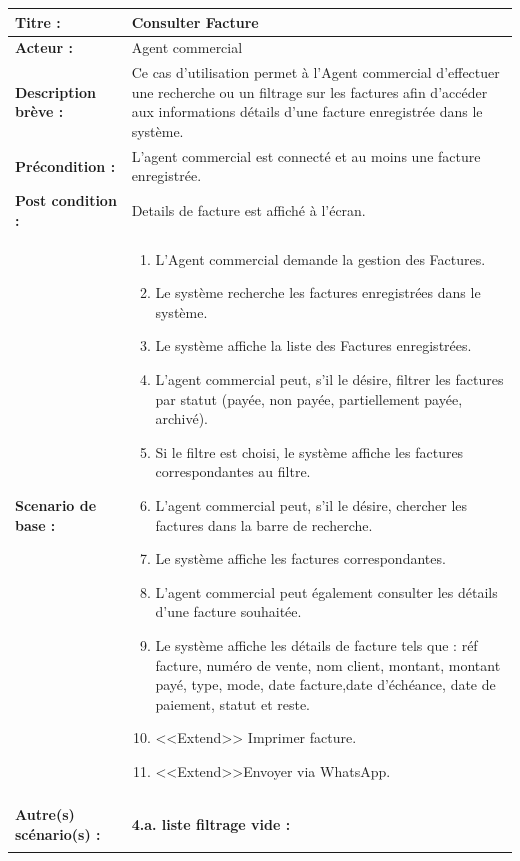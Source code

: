\begin{table}[H]
\footnotesize
\renewcommand{\arraystretch}{0.88}
\begin{tabularx}{\textwidth}{|p{3.4cm}|X|}
\hline
\textbf{Titre :} & Consulter Facture \\
\hline
\textbf{Acteur :} & Agent commercial \\
\hline
\textbf{Description brève :} & Ce cas d'utilisation permet à l'Agent commercial d'effectuer une recherche ou un filtrage sur les factures afin d'accéder aux informations détails d'une facture enregistrée dans le système. \\
\hline
\textbf{Précondition :} & L'agent commercial est connecté et au moins une facture enregistrée. \\
\hline
\textbf{Post condition :} & Details de facture est affiché à l'écran. \\
\hline
\textbf{Scenario de base :} &
\begin{enumerate}[leftmargin=1.5em, topsep=1pt, itemsep=0pt]
  \item L'Agent commercial demande la gestion des Factures.
  \item Le système recherche les factures enregistrées dans le système.
  \item Le système affiche la liste des Factures enregistrées.
  \item L'agent commercial peut, s'il le désire, filtrer les factures par statut (payée, non payée, partiellement payée, archivé).
  \item Si le filtre est choisi, le système affiche les factures correspondantes au filtre.
  \item L'agent commercial peut, s'il le désire, chercher les factures dans la barre de recherche.
  \item Le système affiche les factures correspondantes.
  \item L'agent commercial peut également consulter les détails d'une facture souhaitée.
  \item Le système affiche les détails de facture tels que : réf facture, numéro de vente, nom client, montant, montant payé, type, mode, date facture,date d'échéance, date de paiement, statut et reste.
  \item <<Extend>> Imprimer facture.
  \item <<Extend>>Envoyer via WhatsApp.
\end{enumerate} \\
\hline
\textbf{Autre(s) scénario(s) :} &
\textbf{4.a. liste filtrage vide :}
\begin{enumerate}[leftmargin=1.5em, topsep=1pt, itemsep=0pt]

\end{enumerate}
\end{tabularx}
\end{table}
